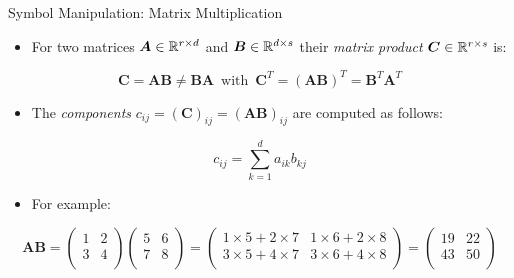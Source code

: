 \documentclass[mathserif, aspectratio=169]{beamer}
\begin{document}
\begin{frame}{Symbol Manipulation: Matrix Multiplication}
	\begin{itemize}
		\item For two matrices $\bm{A} \in \mathbb{R}^{r\times d}$ and $\bm{B} \in \mathbb{R}^{d\times s}$ their \emph{matrix product}
			$\bm{C} \in \mathbb{R}^{r\times s}$ is:
	\end{itemize}
	\vspace{-12mm}
	\begin{center}
		\[ \bm{C} = \bm{AB} \ne \bm{BA} \,\,\,\mathrm{with}\,\,\, \bm{C}^T = (\bm{AB})^T = \bm{B}^T \bm{A}^T \]
	\end{center}
	\begin{itemize}
		\item The \emph{components} $c_{ij} = (\bm{C})_{ij} = (\bm{AB})_{ij}$ are computed as follows: 
	\end{itemize}
	\vspace{-12mm}
	\begin{center}
		\[ c_{ij} = \sum_{k = 1}^{d} a_{ik}b_{kj} \]
	\end{center}
	\vspace{-5mm}
	\begin{itemize}
		\item For example:
	\end{itemize}
	\vspace{-12mm}
	\begin{center}
		\[
			\bm{AB} =
			\begin{pmatrix}
				1 & 2 \\ 3 & 4 \\
			\end{pmatrix}
			\begin{pmatrix}
				5 & 6 \\ 7 & 8 \\
			\end{pmatrix}
			=
			\begin{pmatrix}
				1\times 5 + 2\times 7 & 1\times 6 + 2\times 8\\ 
				3\times 5 + 4\times 7 & 3\times 6 + 4\times 8 \\
			\end{pmatrix}
			=
			\begin{pmatrix}
				19 & 22 \\ 43 & 50 \\
			\end{pmatrix}
		\]
	\end{center}
\end{frame}
\end{document}
